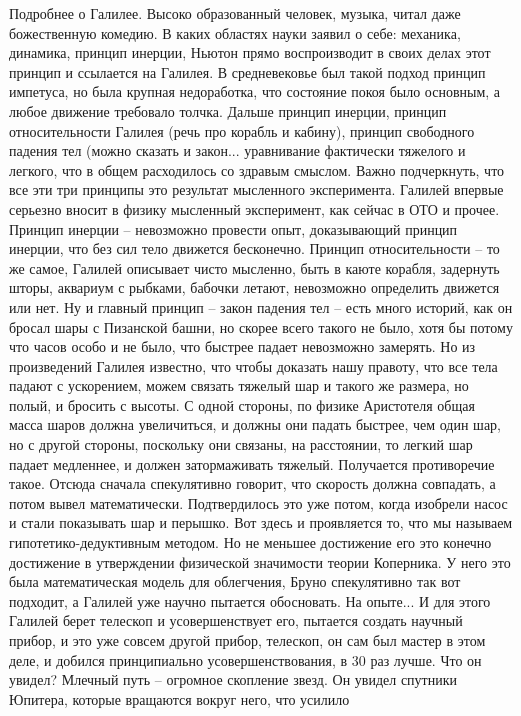 \documentclass[a4paper, 12pt]{article}
\begin{document}
Подробнее о Галилее. Высоко образованный человек, музыка, читал даже 
божественную комедию. В каких областях науки заявил о себе: механика, 
динамика, принцип инерции, Ньютон прямо воспроизводит в своих делах этот 
принцип и ссылается на Галилея. В средневековье был такой подход принцип 
импетуса, но была крупная недоработка, что состояние покоя было 
основным, а любое движение требовало толчка. Дальше принцип инерции, 
принцип относительности Галилея (речь про корабль и кабину), принцип 
свободного падения тел (можно сказать и закон... уравнивание фактически 
тяжелого и легкого, что в общем расходилось со здравым смыслом. Важно 
подчеркнуть, что все эти три принципы это результат мысленного 
эксперимента. Галилей впервые серьезно вносит в физику мысленный 
эксперимент, как сейчас в ОТО и прочее. Принцип инерции -- невозможно 
провести опыт, доказывающий принцип инерции, что без сил тело движется 
бесконечно. Принцип относительности -- то же самое, Галилей описывает 
чисто мысленно, быть в каюте корабля, задернуть шторы, аквариум 
с рыбками, бабочки летают, невозможно определить движется или нет. Ну 
и главный принцип -- закон падения тел -- есть много историй, как он 
бросал шары с Пизанской башни, но скорее всего такого не было, хотя бы 
потому что часов особо и не было, что быстрее падает невозможно 
замерять. Но из произведений Галилея известно, что чтобы доказать нашу 
правоту, что все тела падают с ускорением, можем связать тяжелый шар 
и такого же размера, но полый, и бросить с высоты. С одной стороны, по 
физике Аристотеля общая масса шаров должна увеличиться, и должны они 
падать быстрее, чем один шар, но с другой стороны, поскольку они 
связаны, на расстоянии, то легкий шар падает медленнее, и должен 
затормаживать тяжелый. Получается противоречие такое. Отсюда сначала 
спекулятивно говорит, что скорость должна совпадать, а потом вывел 
математически. Подтвердилось это уже потом, когда изобрели насос и стали 
показывать шар и перышко. Вот здесь и проявляется то, что мы называем 
гипотетико-дедуктивным методом. Но не меньшее достижение его это конечно 
достижение в утверждении физической значимости теории Коперника. У него 
это была математическая модель для облегчения, Бруно спекулятивно так 
вот подходит, а Галилей уже научно пытается обосновать. На опыте... 
И для этого Галилей берет телескоп и усовершенствует его, пытается 
создать научный прибор, и это уже совсем другой прибор, телескоп, он сам 
был мастер в этом деле, и добился принципиально усовершенствования, в 30 
раз лучше. Что он увидел? Млечный путь -- огромное скопление звезд. Он 
увидел спутники Юпитера, которые вращаются вокруг него, что усилило 
\end{document}
